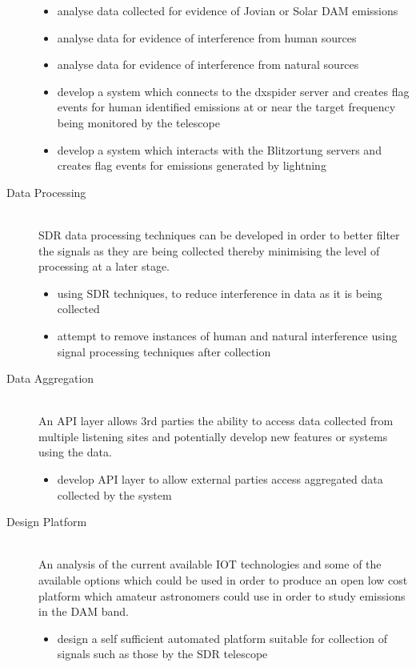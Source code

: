 \documentclass[runningheads,a4paper]{llncs}
\begin{document}
\begin{description}
    \begin{itemize}
      \item analyse data collected for evidence of Jovian or Solar \gls{DAM} emissions
      \item analyse data for evidence of interference from human sources
      \item analyse data for evidence of interference from natural sources
      \item develop a system which connects to the dxspider server and creates flag events for human identified emissions at or near the target frequency being monitored by the telescope
      \item develop a system which interacts with the Blitzortung servers and creates flag events for emissions generated by lightning \\
    \end{itemize}
  \item [Data Processing] \hfill \\
    \gls{SDR} data processing techniques can be developed in order to better filter the signals as they are being collected thereby minimising the level of processing at a later stage.
    \begin{itemize}
      \item using \gls{SDR} techniques, to reduce interference in data as it is being collected
      \item attempt to remove instances of human and natural interference using signal processing techniques after collection \\
    \end{itemize}
  \item [Data Aggregation] \hfill \\
    An API layer allows 3rd parties the ability to access data collected from multiple listening sites and potentially develop new features or systems using the data.
    \begin{itemize}
      \item develop API layer to allow external parties access aggregated data collected by the system \\
    \end{itemize}
  \item [Design Platform] \hfill \\
    An analysis of the current available \gls{IOT} technologies and some of the available options which could be used in order to produce an open low cost platform which amateur astronomers could use in order to study emissions in the \gls{DAM} band.
    \begin{itemize}
      \item design a self sufficient automated platform suitable for collection of signals such as those by the \gls{SDR} telescope \\
    \end{itemize}
\end{description}
\end{document}

